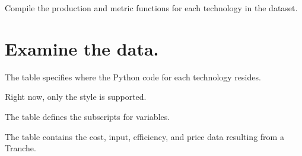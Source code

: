 \documentclass[letterpaper,10pt,english]{sphinxmanual}
\begin{document}
\begin{sphinxVerbatim}[commandchars=\\\{\}]
  
\end{sphinxVerbatim}

\begin{sphinxVerbatim}[commandchars=\\\{\}]
  
\end{sphinxVerbatim}

\sphinxAtStartPar
Compile the production and metric functions for each technology in the dataset.

\begin{sphinxVerbatim}[commandchars=\\\{\}]
\end{sphinxVerbatim}


\section{Examine the data.}
\label{\detokenize{example-analysis:examine-the-data}}
\sphinxAtStartPar
The  table specifies where the Python code for each technology resides.

\begin{sphinxVerbatim}[commandchars=\\\{\}]
\end{sphinxVerbatim}



\sphinxAtStartPar
Right now, only the style  is supported.

\sphinxAtStartPar
The  table defines the subscripts for variables.

\begin{sphinxVerbatim}[commandchars=\\\{\}]
\end{sphinxVerbatim}



\sphinxAtStartPar
The  table contains the cost, input, efficiency, and price data resulting from a Tranche.
\end{document}
